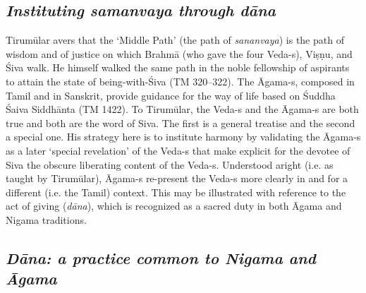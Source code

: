 \subsection*{\textit{Instituting samanvaya through dāna}}

Tirumūlar avers that the ‘Middle Path’ (the path of \textit{sananvaya}) is the path of wisdom and of justice on which Brahmā (who gave the four Veda-s), Viṣṇu, and Śiva walk. He himself walked the same path in the noble fellowship of aspirants to attain the state of being-with-Śiva (TM 320–322). The Āgama-s, composed in Tamil and in Sanskrit, provide guidance for the way of life based on Śuddha Śaiva Siddhānta (TM 1422). To Tirumūlar, the Veda-s and the Āgama-s are both true and both are the word of Siva. The first is a general treatise and the second a special one. His strategy here is to institute harmony by validating the Āgama-s as a later ‘special revelation’ of the Veda-s that make explicit for the devotee of Siva the obscure liberating content of the Veda-s. Understood aright (i.e. as taught by Tirumūlar), Āgama-s re-present the Veda-s more clearly in and for a different (i.e. the Tamil) context. This may be illustrated with reference to the act of giving (\textit{dāna}), which is recognized as a sacred duty in both Āgama and Nigama traditions.

\newpage


\subsection*{\textit{Dāna: a practice common to Nigama and Āgama}}

